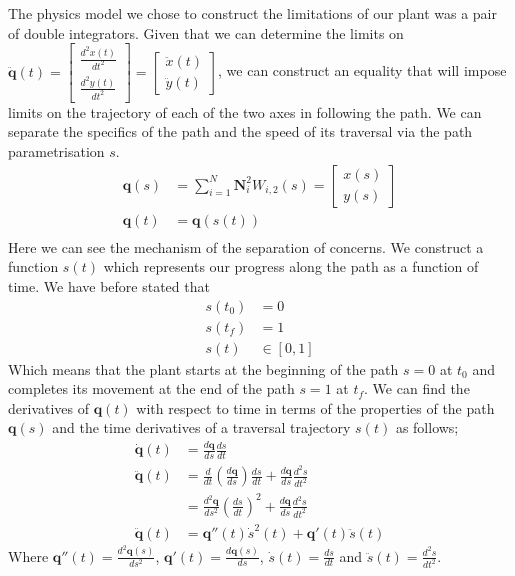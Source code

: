 The physics model we chose to construct the limitations of our plant was a pair of double integrators. Given that we can determine the limits on $\ddot{\textbf{q}}(t)  = \begin{bmatrix}
\frac{d^2x(t)}{dt^2}\\
\frac{d^2y(t)}{dt^2}
\end{bmatrix}= \begin{bmatrix}
\ddot{x}(t)\\
\ddot{y}(t)
\end{bmatrix}$, we can construct an equality that will impose limits on the trajectory of each of the two axes in following the path. We can separate the specifics of the path and the speed of its traversal via the path parametrisation $s$.
\begin{align*}
\textbf{q}(s) &= \sum^N_{i=1}\textbf{N}^2_iW_{i,2}(s) = \begin{bmatrix}
x(s)\\
y(s)
\end{bmatrix}\\
\textbf{q}(t) &= \textbf{q}\left(s(t)\right)\\
\end{align*}
Here we can see the mechanism of the separation of concerns. We construct a function $s(t)$ which represents our progress along the path as a function of time. We have before stated that
\begin{align*}
s(t_0) &= 0\\
s(t_f) &= 1\\
s(t) &\in [0,1] 
\end{align*}
Which means that the plant starts at the beginning of the path $s = 0$ at $t_0$ and completes its movement at the end of the path $s = 1$ at $t_f$. We can find the derivatives of $\textbf{q}(t)$ with respect to time in terms of the properties of the path $\textbf{q}(s)$ and the time derivatives of a traversal trajectory $s(t)$ as follows;
\begin{align*}
\dot{\textbf{q}}(t) &= \frac{d\textbf{q}}{ds} \frac{ds}{dt}\\
\ddot{\textbf{q}}(t) &= \frac{d}{dt}\left(\frac{d\textbf{q}}{ds}\right)\frac{ds}{dt} +  \frac{d\textbf{q}}{ds}\frac{d^2s}{dt^2}\\
 &= \frac{d^2\textbf{q}}{ds^2}\left(\frac{ds}{dt}\right)^2 +  \frac{d\textbf{q}}{ds}\frac{d^2s}{dt^2}\\
 \ddot{\textbf{q}}(t) &= \textbf{q}''(t)\dot{s}^2(t) + \textbf{q}'(t)\ddot{s}(t)
\end{align*}
Where $\textbf{q}''(t) = \frac{d^2\textbf{q}(s)}{ds^2}$, $\textbf{q}'(t) = \frac{d\textbf{q}(s)}{ds}$, $\dot{s}(t) = \frac{ds}{dt}$ and $\ddot{s}(t) = \frac{d^2s}{dt^2}$.

